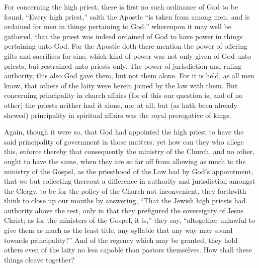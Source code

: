 For concerning the high priest, there is first no such ordinance of God to be found. “Every high priest,” saith the Apostle “is taken from among men, and is ordained for  men in things pertaining to God:” whereupon it may well be gathered, that the priest was indeed ordained of God to have power in things pertaining unto God. For the Apostle doth there mention the power of offering gifts and sacrifices for sins; which kind of power was not only given of God unto priests, but restrained unto priests only. The power of jurisdiction and ruling authority, this also God gave them, but not them alone. For it is held, as all men know, that others of the laity were herein joined by the law with them. But concerning principality in church affairs (for of this our question is, and of no other) the priests neither had it alone, nor at all; but (as hath been already shewed) principality in spiritual affairs was the royal prerogative of kings.

Again, though it were so, that God had appointed the high priest to have the said principality of government in those matters; yet how can they who allege this, enforce thereby that consequently the ministry of the Church, and no other, ought to have the same, when they are so far off from allowing as much to the ministry of the Gospel, as the priesthood of the Law had by God’s appointment, that we but collecting thereout a difference in authority and jurisdiction amongst the Clergy, to be for the policy of the Church not inconvenient, they forthwith think to close up our mouths by answering, “That the Jewish high priests had authority above the rest, only in that they prefigured the sovereignty of Jesus Christ; as for the ministers of the Gospel, it is,” they say, “altogether unlawful to give them as much as the least title, any syllable that any way may sound towards principality?” And of the regency which may be granted, they hold others even of the laity no less capable than pastors themselves. How shall these things cleave together?

